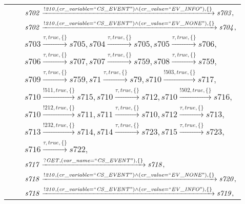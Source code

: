 \begin{tabular}{lcl}
& & $\mathit{s702}\xrightarrow{\mathit{!210}, \mathit{(cr\_variable = ``CS\_EVENT") \land (cr\_value = ``EV\_INFO")}, \{\}}\mathit{s703},$ \\
& & $\mathit{s702}\xrightarrow{\mathit{!210}, \mathit{(cr\_variable = ``CS\_EVENT") \land (cr\_value = ``EV\_NONE")}, \{\}}\mathit{s704},$ \\
& & $\mathit{s703}\xrightarrow{\mathit{\tau}, \mathit{true}, \{\}}\mathit{s705},\mathit{s704}\xrightarrow{\mathit{\tau}, \mathit{true}, \{\}}\mathit{s705},\mathit{s705}\xrightarrow{\mathit{\tau}, \mathit{true}, \{\}}\mathit{s706},$ \\
& & $\mathit{s706}\xrightarrow{\mathit{\tau}, \mathit{true}, \{\}}\mathit{s707},\mathit{s707}\xrightarrow{\mathit{\tau}, \mathit{true}, \{\}}\mathit{s759},\mathit{s708}\xrightarrow{\mathit{\tau}, \mathit{true}, \{\}}\mathit{s759},$ \\
& & $\mathit{s709}\xrightarrow{\mathit{\tau}, \mathit{true}, \{\}}\mathit{s759},\mathit{s71}\xrightarrow{\mathit{\tau}, \mathit{true}, \{\}}\mathit{s79},\mathit{s710}\xrightarrow{\mathit{!503}, \mathit{true}, \{\}}\mathit{s717},$ \\
& & $\mathit{s710}\xrightarrow{\mathit{!511}, \mathit{true}, \{\}}\mathit{s715},\mathit{s710}\xrightarrow{\mathit{\tau}, \mathit{true}, \{\}}\mathit{s712},\mathit{s710}\xrightarrow{\mathit{!502}, \mathit{true}, \{\}}\mathit{s716},$ \\
& & $\mathit{s710}\xrightarrow{\mathit{!212}, \mathit{true}, \{\}}\mathit{s711},\mathit{s711}\xrightarrow{\mathit{\tau}, \mathit{true}, \{\}}\mathit{s710},\mathit{s712}\xrightarrow{\mathit{\tau}, \mathit{true}, \{\}}\mathit{s713},$ \\
& & $\mathit{s713}\xrightarrow{\mathit{!232}, \mathit{true}, \{\}}\mathit{s714},\mathit{s714}\xrightarrow{\mathit{\tau}, \mathit{true}, \{\}}\mathit{s723},\mathit{s715}\xrightarrow{\mathit{\tau}, \mathit{true}, \{\}}\mathit{s723},$ \\
& & $\mathit{s716}\xrightarrow{\mathit{\tau}, \mathit{true}, \{\}}\mathit{s722},$ \\
& & $\mathit{s717}\xrightarrow{\mathit{?GET}, \mathit{(var\_name = ``CS\_EVENT")}, \{\}}\mathit{s718},$ \\
& & $\mathit{s718}\xrightarrow{\mathit{!210}, \mathit{(cr\_variable = ``CS\_EVENT") \land (cr\_value = ``EV\_NONE")}, \{\}}\mathit{s720},$ \\
& & $\mathit{s718}\xrightarrow{\mathit{!210}, \mathit{(cr\_variable = ``CS\_EVENT") \land (cr\_value = ``EV\_INFO")}, \{\}}\mathit{s719},$ \\

\end{tabular}
